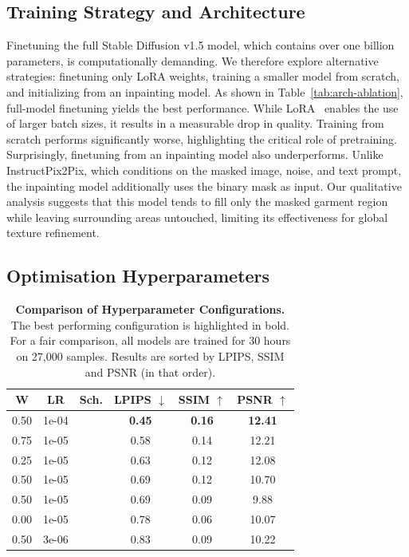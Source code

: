 \documentclass[11pt,twocolumn]{article}
\newcommand{\cmark}{\checkmark}
\newcommand{\xmark}{\ding{55}}
\begin{document}
\subsection{Training Strategy and Architecture}

Finetuning the full Stable Diffusion v1.5 model, which contains over one billion parameters, 
is computationally demanding. We therefore explore alternative strategies: finetuning only LoRA weights, training a smaller model 
from scratch, and initializing from an inpainting model. As shown in Table~\ref{tab:arch-ablation}, full-model finetuning yields 
the best performance. While LoRA~\cite{lora} enables the use of larger batch sizes, 
it results in a measurable drop in quality. Training from scratch performs significantly worse, 
highlighting the critical role of pretraining. Surprisingly, finetuning from an inpainting model also underperforms. 
Unlike InstructPix2Pix, which conditions on the masked image, noise, and text prompt, the inpainting model additionally uses the binary mask as 
input. Our qualitative analysis suggests that this model tends to fill only the masked garment region while leaving 
surrounding areas untouched, limiting its effectiveness for global texture refinement.


\subsection{Optimisation Hyperparameters}

\begin{table}[t]
  \centering
  \begin{tabular}{ccc|ccc}
  \toprule
  \textbf{W} & \textbf{LR} & \textbf{Sch.} & \textbf{LPIPS} $\downarrow$ & \textbf{SSIM} $\uparrow$ & \textbf{PSNR} $\uparrow$ \\
  \midrule
  0.50 & 1e-04 & \xmark & \textbf{0.45} & \textbf{0.16} & \textbf{12.41} \\
  0.75 & 1e-05 & \xmark & 0.58 & 0.14 & 12.21 \\
  0.25 & 1e-05 & \xmark & 0.63 & 0.12 & 12.08 \\
  0.50 & 1e-05 & \cmark & 0.69 & 0.12 & 10.70 \\
  0.50 & 1e-05 & \xmark & 0.69 & 0.09 & 9.88 \\
  0.00 & 1e-05 & \xmark & 0.78 & 0.06 & 10.07 \\
  0.50 & 3e-06 & \xmark & 0.83 & 0.09 & 10.22 \\
  \bottomrule
  \end{tabular}
  \caption{\textbf{Comparison of Hyperparameter Configurations.} 
  The best performing configuration is highlighted in bold. For a 
  fair comparison, all models are trained for 30 hours on 27,000 samples. Results are sorted by LPIPS, SSIM and PSNR (in that order).}
  \label{tab:hyperparams}
\end{table}
\end{document}
